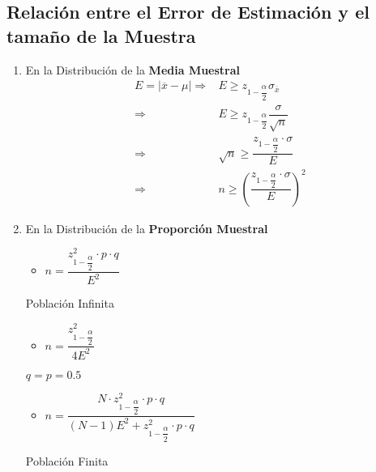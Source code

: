 \subsection{Relación entre el Error de Estimación y el tamaño de la Muestra}
\begin{enumerate}[label=\textbf{(\Roman*)}]
  \item En la Distribución de la \textbf{Media Muestral}
  \begin{align*}
  E=|\overline{x}-\mu| \Rightarrow & E\geq z_{1-\dfrac{\alpha}{2}} \sigma_{\overline{x}} \\
  			     \Rightarrow & E\geq z_{1-\dfrac{\alpha}{2}} \dfrac{\sigma}{\sqrt{n}}\\
  			     \Rightarrow & \sqrt{n}\geq  \dfrac{z_{1-\dfrac{\alpha}{2}}\cdot\sigma}{E} \\
  			     \Rightarrow & n\geq  \left(\dfrac{z_{1-\dfrac{\alpha}{2}}\cdot\sigma}{E}\right)^2
  \end{align*}
  \item En la Distribución de la \textbf{Proporción Muestral}
  \begin{multicols}{3}
\begin{itemize}
\item $n=\dfrac{z_{1-\dfrac{\alpha}{2}}^2\cdot p\cdot q}{E^2}$
\end{itemize}
Población Infinita
\columnbreak
\begin{itemize}
\item $n=\dfrac{z_{1-\dfrac{\alpha}{2}}^2}{4E^2}$
\end{itemize}
$q = p = 0.5 $
\columnbreak
\begin{itemize}
\item $n=\dfrac{N\cdot z_{1-\dfrac{\alpha}{2}}^2 \cdot p\cdot q}{(N-1)E^2 + z_{1-\dfrac{\alpha}{2}}^2 \cdot p\cdot q}$
\end{itemize}
Población Finita
\end{multicols}
\end{enumerate}